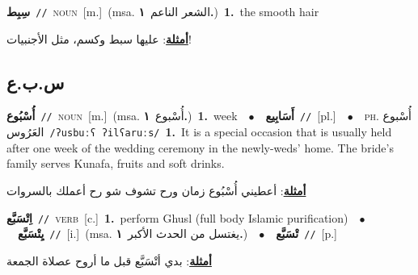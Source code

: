 \documentclass[10pt,a4paper,twoside]{article} %
\begin{document}
\begin{multicols}{2}
{{{{{{\setlength\topsep{0pt}\textbf{\foreignlanguage{arabic}{سِبِط}}\ {\color{gray}\texttt{//}\color{black}}\ \textsc{noun}\ [m.]\ \color{gray}(msa. \foreignlanguage{arabic}{الشعر الناعم}~\foreignlanguage{arabic}{\textbf{١.}})\color{black}\ \textbf{1.}~the smooth hair\  \begin{flushright}\color{gray}\foreignlanguage{arabic}{\textbf{\underline{\foreignlanguage{arabic}{أمثلة}}}: عليها سبط وكسم، مثل الأجنبيات!}\end{flushright}\color{black}} \vspace{2mm}

\vspace{-3mm}
\subsection*{\color{blue}\foreignlanguage{arabic}{س.ب.ع}\color{blue}{}} 

{\setlength\topsep{0pt}\textbf{\foreignlanguage{arabic}{أُسْبُوع}}\ {\color{gray}\texttt{//}\color{black}}\ \textsc{noun}\ [m.]\ \color{gray}(msa. \foreignlanguage{arabic}{أُسْبوع}~\foreignlanguage{arabic}{\textbf{١.}})\color{black}\ \textbf{1.}~week\ \ $\bullet$\ \ \setlength\topsep{0pt}\textbf{\foreignlanguage{arabic}{أَسَابِيع}}\ {\color{gray}\texttt{//}\color{black}}\ [pl.]\ \ $\bullet$\ \ \textsc{ph.} \color{gray} \foreignlanguage{arabic}{أُسْبوع العَرُوس}\color{black}\ {\color{gray}\texttt{/{\sffamily ʔusbuːʕ ʔilʕaruːs}/}\color{black}}\ \textbf{1.}~It is a special occasion that is usually held after one week of the wedding ceremony in the newly-weds' home. The bride's family serves Kunafa, fruits and soft drinks.\  \begin{flushright}\color{gray}\foreignlanguage{arabic}{\textbf{\underline{\foreignlanguage{arabic}{أمثلة}}}: أعطيني أُسْبُوع زمان ورح تشوف شو رح أعملك بالسروات}\end{flushright}\color{black}} \vspace{2mm}

{\setlength\topsep{0pt}\textbf{\foreignlanguage{arabic}{اِتْسَبَّع}}\ {\color{gray}\texttt{//}\color{black}}\ \textsc{verb}\ [c.]\ \textbf{1.}~perform Ghusl (full body Islamic purification)\ \ $\bullet$\ \ \setlength\topsep{0pt}\textbf{\foreignlanguage{arabic}{يِتْسَبَّع}}\ {\color{gray}\texttt{//}\color{black}}\ [i.]\ \color{gray}(msa. \foreignlanguage{arabic}{يغتسل من الحدث الأكبر}~\foreignlanguage{arabic}{\textbf{١.}})\color{black}\ \ $\bullet$\ \ \setlength\topsep{0pt}\textbf{\foreignlanguage{arabic}{تْسَبَّع}}\ {\color{gray}\texttt{//}\color{black}}\ [p.]\  \begin{flushright}\color{gray}\foreignlanguage{arabic}{\textbf{\underline{\foreignlanguage{arabic}{أمثلة}}}: بدي أتْسَبَّع قبل ما أروح عصلاة الجمعة}\end{flushright}\color{black}} \vspace{2mm}

}}}}}
\end{multicols}
\end{document}
